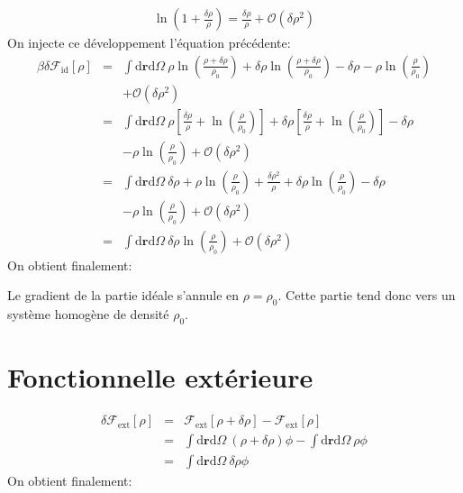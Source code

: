 \begin{eqnarray}
\ln(1+\frac{\delta \rho}{\rho}) = \frac{\delta \rho}{\rho} + \mathcal{O}(\delta\rho^{2})
\end{eqnarray}
On injecte ce développement l'équation précédente:
\begin{eqnarray}
\beta \delta \mathcal{F}_\mathrm{id}[\rho] &=& \int\mathrm{d}\boldsymbol{r}\mathrm{d}\Omega\ \rho \ln(\frac{\rho + \delta \rho}{\rho_0})  + \delta \rho\ln(\frac{\rho + \delta \rho}{\rho_0}) - \delta\rho - \rho\ln(\frac{\rho}{\rho_0})\\
& & + \mathcal{O}(\delta\rho^{2}) \nonumber \\
&=& \int\mathrm{d}\boldsymbol{r}\mathrm{d}\Omega\ \rho [\frac{\delta \rho}{\rho} + \ln(\frac{\rho}{\rho_0})] + \delta \rho[\frac{\delta \rho}{\rho} + \ln(\frac{\rho}{\rho_0})] - \delta\rho \\
& & - \rho\ln(\frac{\rho}{\rho_0}) + \mathcal{O}(\delta\rho^{2}) \nonumber \\
&=& \int\mathrm{d}\boldsymbol{r}\mathrm{d}\Omega\ \delta\rho + \rho \ln(\frac{\rho}{\rho_0}) + \frac{\delta \rho^2}{\rho} + \delta \rho \ln(\frac{\rho}{\rho_0}) - \delta\rho \\
& & - \rho\ln(\frac{\rho}{\rho_0}) + \mathcal{O}(\delta\rho^{2}) \nonumber \\
&=& \int\mathrm{d}\boldsymbol{r}\mathrm{d}\Omega\ \delta \rho \ln(\frac{\rho}{\rho_0}) + \mathcal{O}(\delta\rho^{2})
\end{eqnarray}
On obtient finalement:

Le gradient de la partie idéale s'annule en $\rho=\rho_0$. Cette partie tend donc vers un système homogène de densité $\rho_0$.


\section{Fonctionnelle extérieure}
\label{sec:annexes:grad:ext}
\begin{eqnarray}
\delta \mathcal{F}_\mathrm{ext}[\rho] &=& \mathcal{F}_\mathrm{ext}[\rho + \delta \rho] -\mathcal{F}_\mathrm{ext}[\rho] \\
&=& \int\mathrm{d}\boldsymbol{r}\mathrm{d}\Omega\ (\rho+\delta\rho)\phi - \int\mathrm{d}\boldsymbol{r}\mathrm{d}\Omega\ \rho\phi  \\
&=& \int\mathrm{d}\boldsymbol{r}\mathrm{d}\Omega\ \delta\rho\phi
\end{eqnarray}
On obtient finalement:


